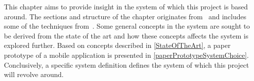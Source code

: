This chapter aims to provide insight in the system of which this project is based around. The sections and structure of the chapter originates from~ and includes some of the techniques from~. Some general concepts in the system are sought to be derived from the state of the art and how these concepts affects the system is explored further. Based on concepts described in \cref{StateOfTheArt}, a paper prototype of a mobile application is presented in \cref{paperPrototypeSystemChoice}. Conclusively, a specific system definition defines the system of which this project will revolve around.
